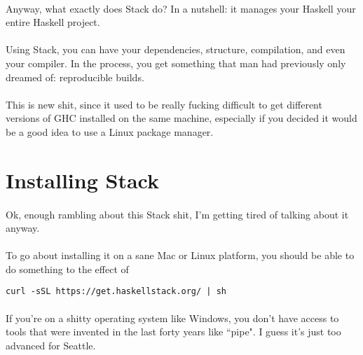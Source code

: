 \paragraph{}
Anyway, what exactly does Stack do?  In a nutshell: it manages your Haskell your entire Haskell project.  

\paragraph{}
Using Stack, you can have your dependencies, structure, compilation, and even your compiler.  In the process, you get something that man had previously only dreamed of: reproducible builds. 

\paragraph{}
This is new shit, since it used to be really fucking difficult to get different versions of GHC installed on the same machine, especially if you decided it would be a good idea to use a Linux package manager. 

\section {Installing Stack}

\paragraph{}
Ok, enough rambling about this Stack shit, I'm getting tired of talking about it anyway.  

\paragraph{}
To go about installing it on a sane Mac or Linux platform, you should be able to do something to the effect of 

\begin{verbatim}
curl -sSL https://get.haskellstack.org/ | sh
\end{verbatim}

\paragraph{}
If you're on a shitty operating system like Windows, you don't have access to tools that were invented in the last forty years like ``pipe".  I guess it's just too advanced for Seattle. 

